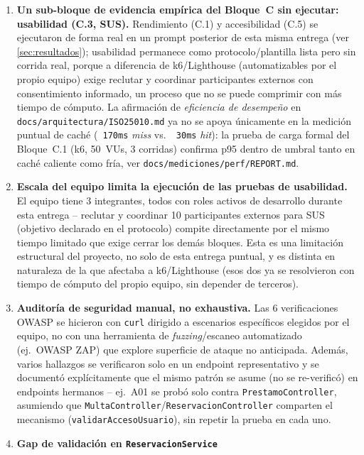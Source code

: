\documentclass[12pt,a4paper]{article}
\begin{document}
\begin{enumerate}[leftmargin=1.2cm]
  \item \textbf{Un sub-bloque de evidencia empírica del Bloque~C sin
    ejecutar: usabilidad (C.3, SUS).} Rendimiento (C.1) y accesibilidad
    (C.5) se ejecutaron de forma real en un prompt posterior de esta misma
    entrega (ver \autoref{sec:resultados}); usabilidad permanece como
    protocolo/plantilla lista pero sin corrida real, porque a diferencia
    de k6/Lighthouse (automatizables por el propio equipo) exige reclutar
    y coordinar participantes externos con consentimiento informado, un
    proceso que no se puede comprimir con más tiempo de cómputo. La
    afirmación de \emph{eficiencia de desempeño} en
    \texttt{docs/arquitectura/ISO25010.md} ya no se apoya únicamente en la
    medición puntual de caché (\texttt{~170ms} \emph{miss} vs.\
    \texttt{~30ms} \emph{hit}): la prueba de carga formal del Bloque~C.1
    (k6, 50~VUs, 3 corridas) confirma p95 dentro de umbral tanto en caché
    caliente como fría, ver \texttt{docs/mediciones/perf/REPORT.md}.
  \item \textbf{Escala del equipo limita la ejecución de las pruebas de
    usabilidad.} El equipo tiene 3 integrantes, todos con roles activos
    de desarrollo durante esta entrega -- reclutar y coordinar 10
    participantes externos para SUS (objetivo declarado en el protocolo)
    compite directamente por el mismo tiempo limitado que exige cerrar
    los demás bloques. Esta es una limitación estructural del proyecto,
    no solo de esta entrega puntual, y es distinta en naturaleza de la que
    afectaba a k6/Lighthouse (esos dos ya se resolvieron con tiempo de
    cómputo del propio equipo, sin depender de terceros).
  \item \textbf{Auditoría de seguridad manual, no exhaustiva.} Las 6
    verificaciones OWASP se hicieron con \texttt{curl} dirigido a
    escenarios específicos elegidos por el equipo, no con una herramienta
    de \emph{fuzzing}/escaneo automatizado (ej.\ OWASP ZAP) que explore
    superficie de ataque no anticipada. Además, varios hallazgos se
    verificaron solo en un endpoint representativo y se documentó
    explícitamente que el mismo patrón se asume (no se re-verificó) en
    endpoints hermanos -- ej.\ A01 se probó solo contra
    \texttt{PrestamoController}, asumiendo que
    \texttt{MultaController}/\texttt{ReservacionController} comparten el
    mecanismo (\texttt{validarAccesoUsuario}), sin repetir la prueba en
    cada uno.
  \item \textbf{Gap de validación en \texttt{ReservacionService}
}
\end{enumerate}
\end{document}

